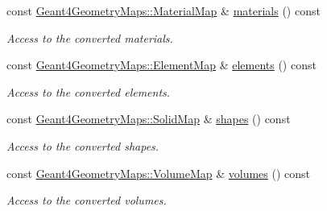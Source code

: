 \begin{Indent}{\bf }\par
{\em \label{_amgrpd41d8cd98f00b204e9800998ecf8427e}
 }\begin{DoxyCompactItemize}
\item 
const \hyperlink{namespace_d_d4hep_1_1_simulation_1_1_geant4_geometry_maps_a0ae377c64e684c47bd3045a9d3d8e248}{Geant4GeometryMaps::MaterialMap} \& \hyperlink{class_d_d4hep_1_1_simulation_1_1_geant4_detector_construction_sequence_abd810f881c6a11acd9ad048b8f908ce6}{materials} () const 
\begin{DoxyCompactList}\small\item\em Access to the converted materials. \item\end{DoxyCompactList}\item 
const \hyperlink{namespace_d_d4hep_1_1_simulation_1_1_geant4_geometry_maps_a175b532b796e7de3d9128c1f0e1ee406}{Geant4GeometryMaps::ElementMap} \& \hyperlink{class_d_d4hep_1_1_simulation_1_1_geant4_detector_construction_sequence_a1b65d4014a1354c2b56158173cd2a108}{elements} () const 
\begin{DoxyCompactList}\small\item\em Access to the converted elements. \item\end{DoxyCompactList}\item 
const \hyperlink{namespace_d_d4hep_1_1_simulation_1_1_geant4_geometry_maps_a5591dbffcd2e6432004034209abd630e}{Geant4GeometryMaps::SolidMap} \& \hyperlink{class_d_d4hep_1_1_simulation_1_1_geant4_detector_construction_sequence_a6fd2ab223f31016b42d3cf07d2901da9}{shapes} () const 
\begin{DoxyCompactList}\small\item\em Access to the converted shapes. \item\end{DoxyCompactList}\item 
const \hyperlink{namespace_d_d4hep_1_1_simulation_1_1_geant4_geometry_maps_a85199a23e6a837678c8e5d5f902fb2e2}{Geant4GeometryMaps::VolumeMap} \& \hyperlink{class_d_d4hep_1_1_simulation_1_1_geant4_detector_construction_sequence_a1e85bfd70c6a133dca29b6b77fb8e12d}{volumes} () const 
\begin{DoxyCompactList}\small\item\em Access to the converted volumes. \item\end{DoxyCompactList}\item 

\end{DoxyCompactItemize}
\end{Indent}
